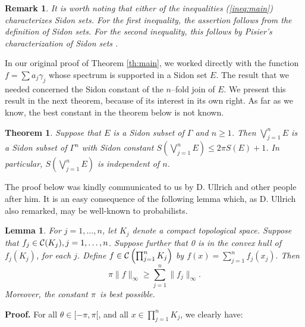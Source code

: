 \newtheorem{rem}[join]{Remark}
\begin{rem}
It is worth noting that either of the inequalities (\ref{ineq:main})
characterizes Sidon sets.  For the first inequality, the assertion
follows
from the definition of Sidon sets.  For the second inequality, this
follows by Pisier's characterization of Sidon sets
\cite{bib:Pi3}.

\end{rem}

In our original proof of Theorem \ref{th:main}, we worked directly with
the function $f=\sum a_j\gamma_j$ whose spectrum is supported in a Sidon
set $E$.  The result that we needed concerned the Sidon constant
of the $n$--fold join of $E$.  We present this result in the next
theorem, because of its interest in its own right.  As far as we know,
the best constant in the theorem below is not known.


\newtheorem{th:join}[join]{Theorem}
\begin{th:join}
Suppose that $E$ is a Sidon subset of $\Gamma$ and $n \geq 1$.  Then
$\bigvee_{j=1}^nE$ is a Sidon subset of $\Gamma^n$ with Sidon constant
$S\left( \bigvee_{j=1}^nE\right) \leq 2\pi S(E) + 1$.  In
particular,
$S\left( \bigvee_{j=1}^nE\right)$ is independent of $n$.


\label{th:join}
\end{th:join}

The proof below was kindly communicated to us by D.
Ullrich and other people after him.  It is an easy consequence of the
following lemma which, as D. Ullrich also remarked, may be well-known to
probabilists.

\newtheorem{Ullrich1}[join]{Lemma}
\begin{Ullrich1}
 For $j = 1, \ldots, n$, let $K_j$ denote a compact topological space.
Suppose that $f_j \in {\cal C}(K_j) , j = 1, \ldots , n$.  Suppose
further
that 0 is in the convex hull of $f_j(K_j)$, for each $j$.  Define $f
\in {\cal C} \left( \prod_{j=1}^nK_j\right)$ by $f(x) =
\sum_{j=1}^nf_j(x_j).$ Then
$$\pi\| f\|_\infty \geq \sum_{j=1}^n\|
f_j\|_\infty.$$
Moreover, the constant $\pi$\ is best possible.


\label{lem:Ullrich}
\end{Ullrich1}

{\bf Proof.}  For all $\theta\in [-\pi,\pi[$, and all $x\in\prod_{j=1}^n
K_j$, we
clearly have:

